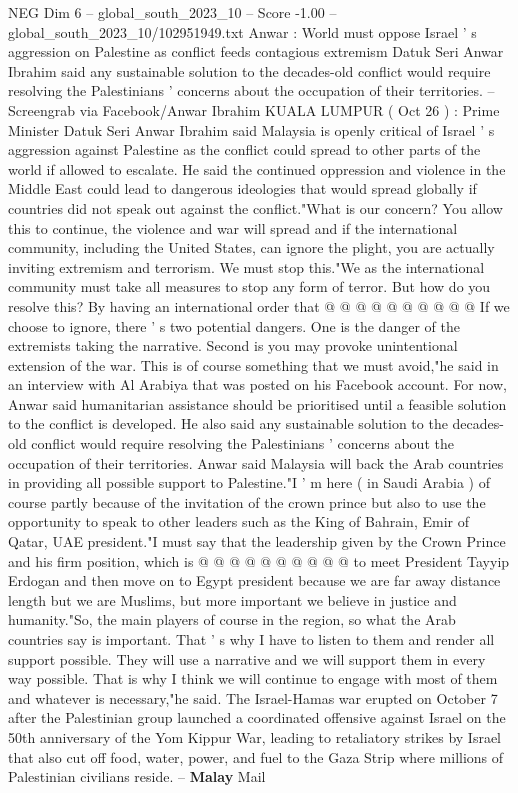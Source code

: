 \begin{textsample}{NEG Dim 6 – global\_south\_2023\_10 – Score -1.00 – global\_south\_2023\_10/102951949.txt}  \label{ex:f6_neg_216}
Anwar : World must oppose Israel ' s aggression on Palestine as conflict feeds contagious extremism Datuk Seri Anwar Ibrahim said any sustainable solution to the decades-old conflict would require resolving the Palestinians ' concerns about the occupation of their territories. -- Screengrab via Facebook/Anwar Ibrahim KUALA LUMPUR ( Oct 26 ) : Prime Minister Datuk Seri Anwar Ibrahim said Malaysia is openly critical of Israel ' s aggression against Palestine as the conflict could spread to other parts of the world if allowed to escalate.
He said the continued oppression and violence in the Middle East could lead to dangerous ideologies that would spread globally if countries did not speak out against the conflict."What is our concern?
You allow this to continue, the violence and war will spread and if the international community, including the United States, can ignore the plight, you are actually inviting extremism and terrorism.
We must stop this."We as the international community must take all measures to stop any form of terror.
But how do you resolve this?
By having an international order that @ @ @ @ @ @ @ @ @ @ If we choose to ignore, there ' s two potential dangers.
One is the danger of the extremists taking the narrative.
Second is you may provoke unintentional extension of the war.
This is of course something that we must avoid,"he said in an interview with Al Arabiya that was posted on his Facebook account.
For now, Anwar said humanitarian assistance should be prioritised until a feasible solution to the conflict is developed.
He also said any sustainable solution to the decades-old conflict would require resolving the Palestinians ' concerns about the occupation of their territories.
Anwar said Malaysia will back the Arab countries in providing all possible support to Palestine."I ' m here ( in Saudi Arabia ) of course partly because of the invitation of the crown prince but also to use the opportunity to speak to other leaders such as the King of Bahrain, Emir of Qatar, UAE president."I must say that the leadership given by the Crown Prince and his firm position, which is @ @ @ @ @ @ @ @ @ @ to meet President Tayyip Erdogan and then move on to Egypt president because we are far away distance length but we are Muslims, but more important we believe in justice and humanity."So, the main players of course in the region, so what the Arab countries say is important.
That ' s why I have to listen to them and render all support possible.
They will use a narrative and we will support them in every way possible.
That is why I think we will continue to engage with most of them and whatever is necessary,"he said.
The Israel-Hamas war erupted on October 7 after the Palestinian group launched a coordinated offensive against Israel on the 50th anniversary of the Yom Kippur War, leading to retaliatory strikes by Israel that also cut off food, water, power, and fuel to the Gaza Strip where millions of Palestinian civilians reside. -- \textbf{Malay} Mail

\end{textsample}
